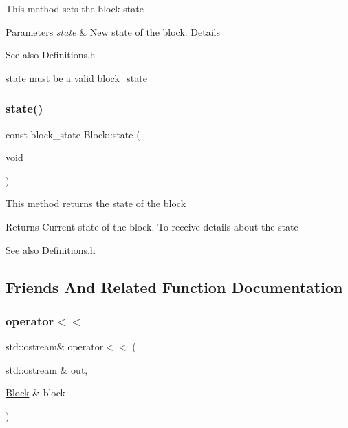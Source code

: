 This method sets the block state


\begin{DoxyParams}{Parameters}
{\em state} & New state of the block. Details \\
\hline
\end{DoxyParams}
\begin{DoxySeeAlso}{See also}
Definitions.\+h
\end{DoxySeeAlso}
state must be a valid block\+\_\+state \mbox{\label{classlogic_1_1_block_a0a84f5b5c790173d5f3ed4db2f33535b}} 
\subsubsection{\texorpdfstring{state()}{state()}}
{\footnotesize\ttfamily const block\+\_\+state Block\+::state (\begin{DoxyParamCaption}\item[{void}]{ }\end{DoxyParamCaption})}

This method returns the state of the block

\begin{DoxyReturn}{Returns}
Current state of the block. To receive details about the state 
\end{DoxyReturn}
\begin{DoxySeeAlso}{See also}
Definitions.\+h 
\end{DoxySeeAlso}


\subsection{Friends And Related Function Documentation}
\mbox{\label{classlogic_1_1_block_a822a522e43e47d065d5c56a2103e08a3}} 
\subsubsection{\texorpdfstring{operator$<$$<$}{operator<<}}
{\footnotesize\ttfamily std\+::ostream\& operator$<$$<$ (\begin{DoxyParamCaption}\item[{std\+::ostream \&}]{out,  }\item[{\mbox{\hyperlink{classlogic_1_1_block}{Block}} \&}]{block }\end{DoxyParamCaption})\hspace{0.3cm}{\ttfamily [friend]}}

